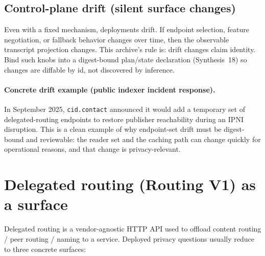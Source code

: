 \documentclass[11pt]{article}
\begin{document}
\subsection{Control-plane drift (silent surface changes)}
Even with a fixed mechanism, deployments drift.
If endpoint selection, feature negotiation, or fallback behavior changes over time, then the observable transcript projection changes.
This archive's rule is: drift changes claim identity.
Bind such knobs into a digest-bound plan/state declaration (Synthesis~18) so changes are diffable by id, not discovered by inference.
\cite{series:planstateequiv}

\paragraph{Concrete drift example (public indexer incident response).}
In September 2025, \texttt{cid.contact} announced it would add a temporary set of delegated-routing endpoints to restore publisher reachability during an IPNI disruption.
This is a clean example of why endpoint-set drift must be digest-bound and reviewable: the reader set and the caching path can change quickly for operational reasons, and that change is privacy-relevant.\cite{ipfsDiscussCidContactEndpoints2025}

\section{Delegated routing (Routing V1) as a surface}
Delegated routing is a vendor-agnostic HTTP API used to offload content routing / peer routing / naming to a service.\cite{ipfsDelegatedRoutingV1Spec,ipip0337}
Deployed privacy questions usually reduce to three concrete surfaces:
\end{document}
